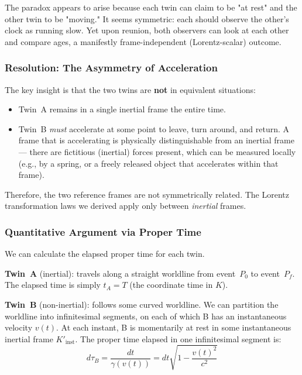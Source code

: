 The paradox appears to arise because each twin can claim to be "at rest" and the other twin to be "moving." It seems symmetric: each should observe the other's clock as running slow. Yet upon reunion, both observers can look at each other and compare ages, a manifestly frame-independent (Lorentz-scalar) outcome.

\subsubsection*{Resolution: The Asymmetry of Acceleration}

The key insight is that the two twins are \textbf{not} in equivalent situations:
\begin{itemize}
    \item Twin~A remains in a single inertial frame the entire time.
    \item Twin~B \emph{must} accelerate at some point to leave, turn around, and return. A frame that is accelerating is physically distinguishable from an inertial frame — there are fictitious (inertial) forces present, which can be measured locally (e.g., by a spring, or a freely released object that accelerates within that frame).
\end{itemize}

Therefore, the two reference frames are not symmetrically related. The Lorentz transformation laws we derived apply only between \emph{inertial} frames.

\subsubsection*{Quantitative Argument via Proper Time}

We can calculate the elapsed proper time for each twin.

\textbf{Twin~A} (inertial): travels along a straight worldline from event~$P_0$ to event~$P_f$. The elapsed time is simply $t_A = T$ (the coordinate time in $K$).

\textbf{Twin~B} (non-inertial): follows some curved worldline. We can partition the worldline into infinitesimal segments, on each of which B has an instantaneous velocity $v(t)$. At each instant, B is momentarily at rest in some instantaneous inertial frame $K'_\text{inst}$. The proper time elapsed in one infinitesimal segment is:
\begin{equation}\label{eq:lec05:proper-time-element}
    d\tau_B = \frac{dt}{\gamma(v(t))}= dt\sqrt{1 - \frac{v(t)^2}{c^2}}
\end{equation}

